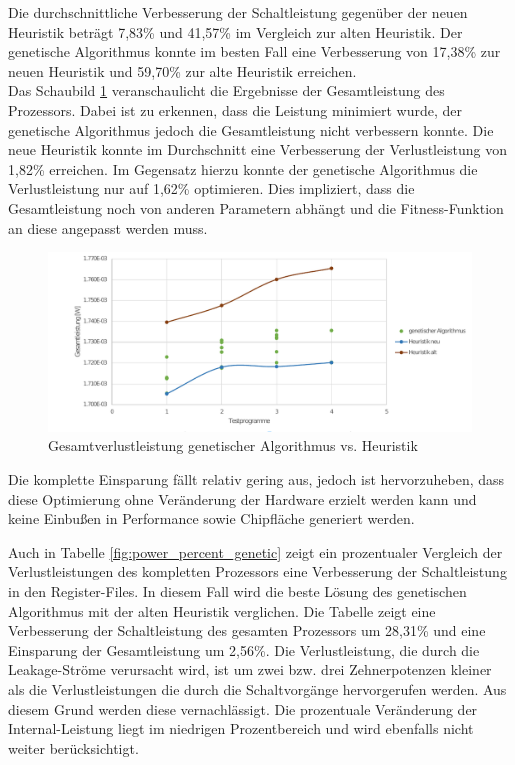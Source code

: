 Die durchschnittliche Verbesserung der Schaltleistung gegenüber der neuen Heuristik beträgt 7,83\% und 41,57\% im Vergleich zur alten Heuristik. Der genetische Algorithmus konnte im besten Fall eine Verbesserung von 17,38\% zur neuen Heuristik und 59,70\% zur alte Heuristik erreichen.\\
Das Schaubild \ref{fig:eval_genetic_total_power} veranschaulicht die Ergebnisse der Gesamtleistung des Prozessors. Dabei ist zu erkennen, dass die Leistung minimiert wurde, der genetische Algorithmus jedoch die Gesamtleistung nicht verbessern konnte. Die neue Heuristik konnte im Durchschnitt eine Verbesserung der Verlustleistung von 1,82\% erreichen. Im Gegensatz hierzu konnte der genetische Algorithmus die Verlustleistung nur auf 1,62\% optimieren. Dies impliziert, dass die Gesamtleistung noch von anderen Parametern abhängt und die Fitness-Funktion an diese angepasst werden muss.

\begin{figure}[H]
	\centering
	\includegraphics[width=\textwidth]{fig/gesamtleistung_genetik_heuristik.pdf}
	\caption{Gesamtverlustleistung genetischer Algorithmus vs. Heuristik}
	\label{fig:eval_genetic_total_power}
\end{figure}

Die komplette Einsparung fällt relativ gering aus, jedoch ist hervorzuheben, dass diese Optimierung ohne Veränderung der Hardware erzielt werden kann und keine Einbußen in Performance sowie Chipfläche generiert werden.
%

Auch in Tabelle \ref{fig:power_percent_genetic} zeigt ein prozentualer Vergleich der Verlustleistungen des kompletten Prozessors eine Verbesserung der Schaltleistung in den Register-Files. In diesem Fall wird die beste Lösung des genetischen Algorithmus mit der alten Heuristik verglichen. Die Tabelle zeigt eine Verbesserung der Schaltleistung des gesamten Prozessors um 28,31\% und eine Einsparung der Gesamtleistung um 2,56\%. Die Verlustleistung, die durch die Leakage-Ströme verursacht wird, ist um zwei bzw. drei Zehnerpotenzen kleiner als die Verlustleistungen die durch die Schaltvorgänge hervorgerufen werden. Aus diesem Grund werden diese vernachlässigt. 
Die prozentuale Veränderung der Internal-Leistung liegt im niedrigen Prozentbereich und wird ebenfalls nicht weiter berücksichtigt. 

